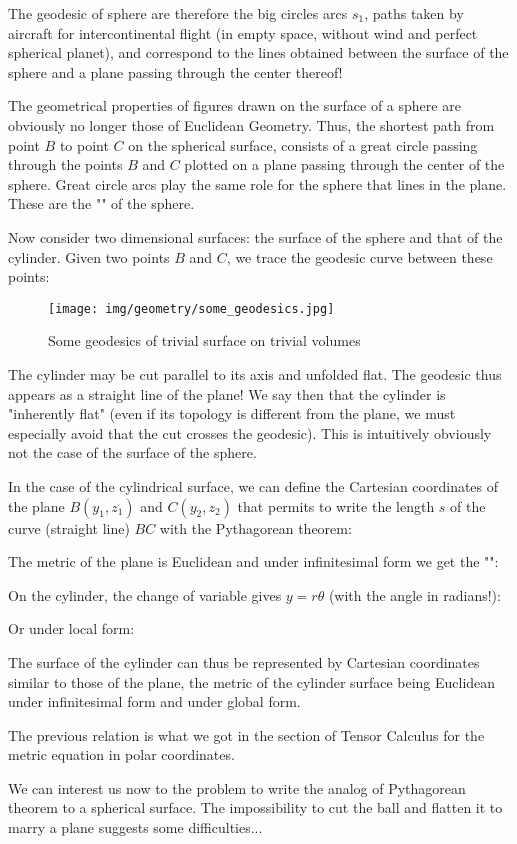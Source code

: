 	The geodesic of sphere are therefore the big circles arcs $s_1$, paths taken by aircraft for intercontinental flight (in empty space, without wind and perfect spherical planet), and correspond to the lines obtained between the surface of the sphere and a plane passing through the center thereof!
	
	The geometrical properties of figures drawn on the surface of a sphere are obviously no longer those of Euclidean Geometry. Thus, the shortest path from point $B$ to point $C$ on the spherical surface, consists of a great circle passing through the points $B$ and $C$ plotted on a plane passing through the center of the sphere. Great circle arcs play the same role for the sphere that lines in the plane. These are the "" of the sphere.
	
	Now consider two dimensional surfaces: the surface of the sphere and that of the cylinder. Given two points $B$ and $C$, we trace the geodesic curve between these points:
	\begin{figure}[H]
		\centering
		\texttt{[image: img/geometry/some\_geodesics.jpg]}
		\caption{Some geodesics of trivial surface on trivial volumes}
	\end{figure}
	
	The cylinder may be cut parallel to its axis and unfolded flat. The geodesic thus appears as a straight line of the plane! We say then that the cylinder is "inherently flat" (even if its topology is different from the plane, we must especially avoid that the cut crosses the geodesic). This is intuitively obviously not the case of the surface of the sphere.
	
	In the case of the cylindrical surface, we can define the Cartesian coordinates of the plane $B(y_1,z_1)$ and $C(y_2,z_2)$ that permits to write the length $s$ of the curve (straight line) $BC$ with the Pythagorean theorem:
	
	The metric of the plane is Euclidean and under infinitesimal form we get the "":
	
	On the cylinder, the change of variable gives $y=r\theta$ (with the angle in radians!):
	
	Or under local form:
	
	The surface of the cylinder can thus be represented by Cartesian coordinates similar to those of the plane, the metric of the cylinder surface being Euclidean under infinitesimal form and under global form.
	\begin{tcolorbox}[title=Remark,colframe=black,arc=10pt]
	The previous relation is what we got in the section of Tensor Calculus for the metric  equation in polar coordinates.
	\end{tcolorbox}
	We can interest us now to the problem to write the analog of Pythagorean theorem to a spherical surface. The impossibility to cut the ball and flatten it to marry a plane suggests some difficulties...
	
